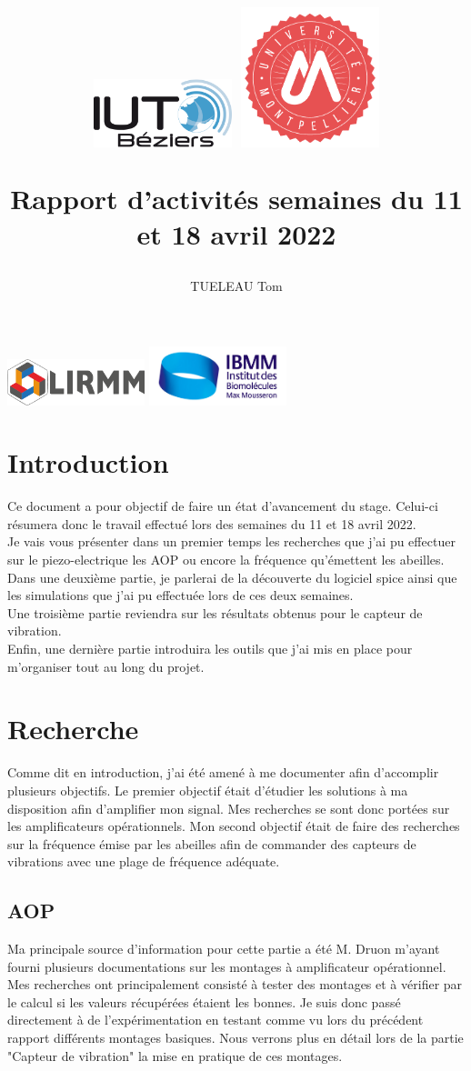 \documentclass[11pt,french,a4paper]{article}
\title{
 \centering
         \includegraphics[width=4cm]{../../../logo/IUTlogo.png}  \hspace{7cm}
         \includegraphics[width=4cm]{../../../logo/UMlogo.png}  \hspace{7cm}
    
	\LARGE{Rapport d'activités semaines du 11 et 18 avril 2022 }
	\author{TUELEAU Tom}
}
\author{
	\date{}
}
\begin{document}
\maketitle
	 \includegraphics[width=4cm]{../../../logo/LIRMMlogo.png}  \hspace{7cm}
         \includegraphics[width=4cm]{../../../logo/IBMMlogo.jpg}  \hspace{7cm}
\newpage
\tableofcontents
\newpage
\section{Introduction}
Ce document a pour objectif de faire un état d'avancement du stage. Celui-ci résumera donc le travail effectué lors des semaines du 11 et 18 avril 2022.
\\Je vais vous présenter dans un premier temps les recherches que j'ai pu effectuer sur le piezo-electrique les AOP ou encore la fréquence qu'émettent les abeilles. 
\\Dans une deuxième partie, je parlerai de la découverte du logiciel spice ainsi que les simulations que j'ai pu effectuée lors de ces deux semaines.
\\Une troisième partie reviendra sur les résultats obtenus pour le capteur de vibration. 
\\Enfin, une dernière partie introduira les outils que j'ai mis en place pour m'organiser tout au long du projet. 

\newpage
\section{Recherche}
Comme dit en introduction, j'ai été amené à me documenter afin d'accomplir plusieurs objectifs. Le premier objectif était d'étudier les solutions à ma disposition afin d'amplifier mon signal. Mes recherches se sont donc portées sur les amplificateurs opérationnels. Mon second objectif était de faire des recherches sur la fréquence émise par les abeilles afin de commander des capteurs de vibrations avec une plage de fréquence adéquate. 
\subsection{AOP}
Ma principale source d'information pour cette partie a été M. Druon m'ayant fourni plusieurs documentations sur les montages à amplificateur opérationnel. 
Mes recherches ont principalement consisté à tester des montages et à vérifier par le calcul si les valeurs récupérées étaient les bonnes.
Je suis donc passé directement à de l'expérimentation en testant comme vu lors du précédent rapport différents montages basiques.
Nous verrons plus en détail lors de la partie "Capteur de vibration" la mise en pratique de ces montages.
\end{document}
